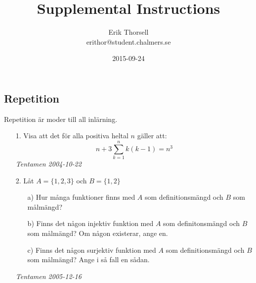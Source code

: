 \documentclass{article}
\title{Supplemental Instructions}
\author{Erik Thorsell \\ 
		\small{erithor@student.chalmers.se}
}
\date{2015-09-24}
\begin{document}
\maketitle

\subsection*{Repetition}
Repetition är moder till all inlärning.
\begin{enumerate}

\item[1.]
Visa att det för alla positiva heltal $n$ gäller att:
$$n+3\sum\limits_{k=1}^{n} k(k-1) = n^3$$
{\it Tentamen 2004-10-22}

\item[2.]
Låt $A=\{1,2,3\}$ och $B=\{1,2\}$
\begin{itemize}
\item[a)] Hur många funktioner finns med $A$ som definitionsmängd och $B$ som målmängd?
\item[b)] Finns det någon injektiv funktion med $A$ som definitonsmängd och $B$ som målmängd?
Om någon existerar, ange en.
\item[c)] Finns det någon surjektiv funktion med $A$ som definitionsmängd och $B$ som målmängd?
Ange i så fall en sådan.
\end{itemize}
{\it Tentamen 2005-12-16}
\end{enumerate}
\end{document}
